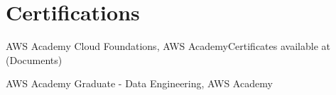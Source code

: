 \section{Certifications}
\noindent AWS Academy Cloud Foundations, AWS Academy\hfill{\small\color{soft}Certificates available at  (Documents)}\par
\noindent AWS Academy Graduate - Data Engineering, AWS Academy\par
